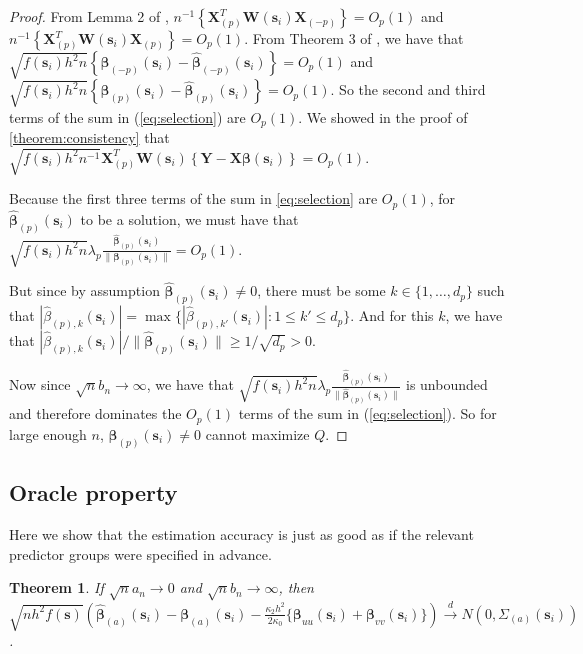 \documentclass[authoryear, review, 11pt]{elsarticle}
\newtheorem{theorem}{Theorem}[section]
\begin{document}
\begin{proof}
      From Lemma 2 of \cite{Sun-Yan-Zhang-Lu-2014}, $n^{-1} \left\{ \bm{X}_{(p)}^T \bm{W}(\bm{s}_i) \bm{X}_{(-p)} \right\} = O_p(1)$ and $n^{-1} \left\{ \bm{X}_{(p)}^T \bm{W}(\bm{s}_i) \bm{X}_{(p)} \right\} = O_p(1)$. From Theorem 3 of \cite{Sun-Yan-Zhang-Lu-2014}, we have that $\sqrt{f(\bm{s}_i) h^2 n} \left\{ \bm{\beta}_{(-p)} (\bm{s}_i) - \hat{\bm{\beta}}_{(-p)} (\bm{s}_i) \right\} = O_p(1)$ and $\sqrt{f(\bm{s}_i) h^2 n} \left\{ \bm{\beta}_{(p)}(\bm{s}_i) - \hat{\bm{\beta}}_{(p)}(\bm{s}_i) \right\} = O_p(1)$. So the second and third terms of the sum in (\ref{eq:selection}) are $O_p(1)$. We showed in the proof of \ref{theorem:consistency} that $\sqrt{f(\bm{s}_i) h^2 n^{-1}} \bm{X}_{(p)}^T \bm{W}(\bm{s}_i) \left\{ \bm{Y} - \bm{X} \bm{\beta}(\bm{s}_i) \right\} = O_p(1)$.

      Because the first three terms of the sum in \ref{eq:selection} are $O_p(1)$, for $\hat{\bm{\beta}}_{(p)} (\bm{s}_i)$ to be a solution, we must have that $\sqrt{f(\bm{s}_i) h^2 n} \lambda_p \frac{ \hat{\bm{\beta}}_{(p)} (\bm{s}_i) }{\| \bm{\beta}_{(p)} (\bm{s}_i) \|} = O_p(1)$.

      But since by assumption $\hat{\bm{\beta}}_{(p)} (\bm{s}_i) \ne 0$, there must be some $k \in \{ 1, \dots, d_p \}$ such that $ | \hat{\beta}_{(p),k} (\bm{s}_i) | = \max \{ | \hat{\beta}_{(p),k'} (\bm{s}_i) | : 1 \le k' \le d_p \} $. And for this $k$, we have that $| \hat{\beta}_{(p),k} (\bm{s}_i) | / \| \hat{\bm{\beta}}_{(p)} (\bm{s}_i) \| \ge 1 / \sqrt{d_p} > 0$.

      Now since $\sqrt{n} b_n \to \infty$, we have that $\sqrt{f(\bm{s}_i) h^2 n} \lambda_p \frac{ \hat{\bm{\beta}}_{(p)} (\bm{s}_i) }{\| \hat{\bm{\beta}}_{(p)} (\bm{s}_i) \|}$ is unbounded and therefore dominates the $O_p(1)$ terms of the sum in (\ref{eq:selection}). So for large enough $n$, $\hat{\bm{\beta}}_{(p)} (\bm{s}_i) \ne 0$ cannot maximize $Q$.
    \end{proof}

  \subsection{Oracle property}
    Here we show that the estimation accuracy is just as good as if the relevant predictor groups were specified in advance.

    \begin{theorem}
      If $\sqrt{n} a_n \to 0$ and $\sqrt{n} b_n \to \infty$, then $\sqrt{n h^2 f(\bm{s})} \left( \hat{\bm{\beta}}_{(a)} (\bm{s}_i) - \bm{\beta}_{(a)} (\bm{s}_i) - \frac{\kappa_2 h^2}{2 \kappa_0} \{ \bm{\beta}_{uu} (\bm{s}_i) + \bm{\beta}_{vv} (\bm{s}_i) \} \right) \xrightarrow{d} N(0,\Sigma_{(a)} (\bm{s}_i))$.
    \end{theorem}
\end{document}
